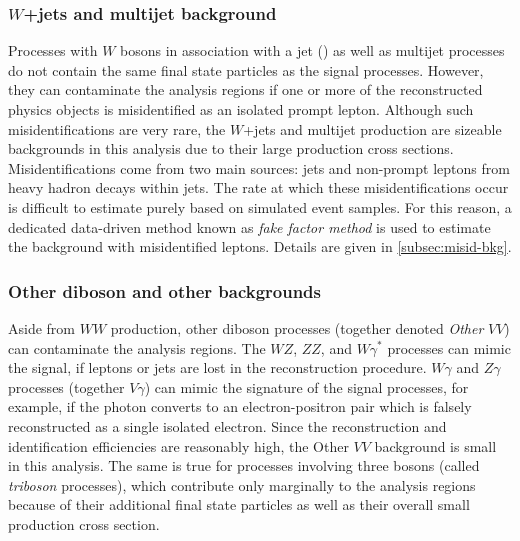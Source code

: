 \subsubsection{$W$+jets and multijet background}
Processes with $W$ bosons in association with a jet (\Wjets) as well as multijet processes do not contain the same final state particles as the signal processes. However, they can contaminate the analysis regions if one or more of the reconstructed physics objects is misidentified as an isolated prompt lepton. 
Although such misidentifications are very rare, the $W$+jets and multijet production are sizeable backgrounds in this analysis due to their large production cross sections.
Misidentifications come from two main sources: jets and non-prompt leptons from heavy hadron decays within jets.
The rate at which these misidentifications occur is difficult to estimate purely based on simulated event samples. For this reason, a dedicated data-driven method known as \emph{fake factor method} is used to estimate the background with misidentified leptons. Details are given in \cref{subsec:misid-bkg}.


\subsubsection{Other diboson and other backgrounds}
Aside from $WW$ production, other diboson processes (together denoted \emph{Other} $VV$) can contaminate the analysis regions. 
The $WZ$, $ZZ$, and $W\gamma^*$ processes can mimic the signal, if leptons or jets are lost in the reconstruction procedure. 
$W\gamma$ and $Z\gamma$ processes (together $V\gamma$) can mimic the signature of the signal processes, for example, if the photon converts to an electron-positron pair which is falsely reconstructed as a single isolated electron. 
Since the reconstruction and identification efficiencies are reasonably high, the Other $VV$ background is small in this analysis.
The same is true for processes involving three bosons (called \emph{triboson} processes), which contribute only marginally to the analysis regions because of their additional final state particles as well as their overall small production cross section. 

